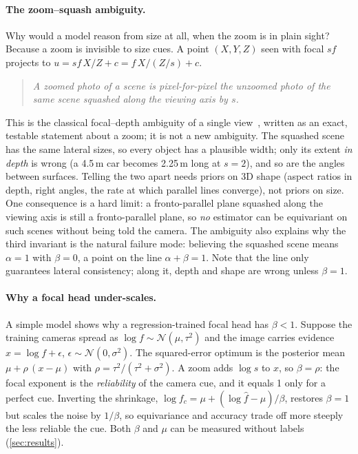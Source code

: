 \paragraph{The zoom--squash ambiguity.}
Why would a model reason from size at all, when the zoom is in plain sight?
Because a zoom is invisible to size cues.
A point $(X,Y,Z)$ seen with focal $sf$ projects to $u = sf\,X/Z + c = f\,X/(Z/s) + c$.
\begin{quote}
\emph{A zoomed photo of a scene is pixel-for-pixel the unzoomed photo of the same scene
squashed along the viewing axis by $s$.}
\end{quote}
This is the classical focal--depth ambiguity of a single view~\cite{he2018focal}, written as an exact, testable
statement about a zoom; it is not a new ambiguity.
The squashed scene has the same lateral sizes, so every object has a plausible width; only its
extent \emph{in depth} is wrong (a 4.5\,m car becomes 2.25\,m long at $s=2$), and so are the
angles between surfaces. Telling the two apart needs priors on 3D shape (aspect ratios in
depth, right angles, the rate at which parallel lines converge), not priors on size.
One consequence is a hard limit: a fronto-parallel plane squashed along the viewing axis is still a fronto-parallel plane, so
\emph{no} estimator can be equivariant on such scenes without being told the camera.
The ambiguity also explains why the third invariant is the natural failure mode: believing the
squashed scene means $\alpha=1$ with $\beta=0$, a point on the line $\alpha+\beta=1$.
Note that the line only guarantees lateral consistency; along it, depth and shape are wrong
unless $\beta=1$.

\paragraph{Why a focal head under-scales.}
A simple model shows why a regression-trained focal head has $\beta<1$. Suppose the training cameras
spread as $\log f\sim\mathcal N(\mu,\tau^2)$ and the image carries evidence $x=\log f+\epsilon$,
$\epsilon\sim\mathcal N(0,\sigma^2)$. The squared-error optimum is the posterior mean $\mu+\rho\,(x-\mu)$ with
$\rho=\tau^2/(\tau^2+\sigma^2)$. A zoom adds $\log s$ to $x$, so $\beta=\rho$: the focal exponent is the
\emph{reliability} of the camera cue, and it equals 1 only for a perfect cue. Inverting the shrinkage,
$\log f_c=\mu+(\log\hat f-\mu)/\beta$, restores $\beta=1$ but scales the noise by $1/\beta$, so equivariance
and accuracy trade off more steeply the less reliable the cue. Both $\beta$ and $\mu$ can be measured without
labels (\cref{sec:results}).


